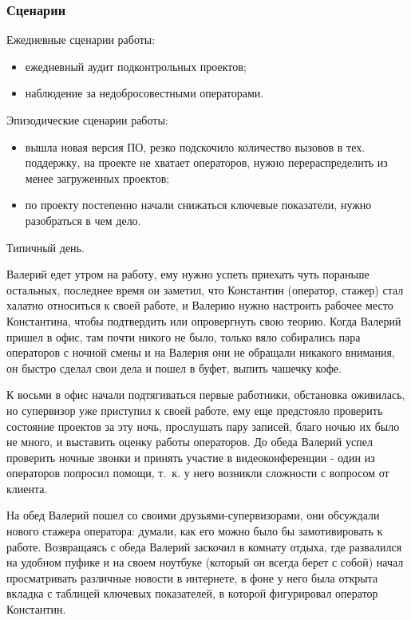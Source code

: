 \subsubsection{Сценарии}

Ежедневные сценарии работы:
\begin{itemize}
    \item ежедневный аудит подконтрольных проектов;
    \item наблюдение за недобросовестными операторами.
\end{itemize}

Эпизодические сценарии работы:
\begin{itemize}
    \item вышла новая версия ПО, резко подскочило количество вызовов в тех. поддержку, на проекте не хватает операторов, нужно перераспределить из менее загруженных проектов;
    \item по проекту постепенно начали снижаться ключевые показатели, нужно разобраться в чем дело.
\end{itemize}

Типичный день.

Валерий едет утром на работу, ему нужно успеть приехать чуть пораньше остальных,
последнее время он заметил, что Константин (оператор, стажер)
стал халатно относиться к своей работе,
и Валерию нужно настроить рабочее место Константина,
чтобы подтвердить или опровергнуть свою теорию.
Когда Валерий пришел в офис, там почти никого не было,
только вяло собирались пара операторов с ночной смены
и на Валерия они не обращали никакого внимания,
он быстро сделал свои дела и пошел в буфет, выпить чашечку кофе.

К восьми в офис начали подтягиваться первые работники, обстановка оживилась,
но супервизор уже приступил к своей работе,
ему еще предстояло проверить состояние проектов за эту ночь,
прослушать пару записей, благо ночью их было не много,
и выставить оценку работы операторов.
До обеда Валерий успел проверить ночные звонки и принять участие в
видеоконференции - один из операторов попросил помощи,
т.~к. у него возникли сложности с вопросом от клиента.

На обед Валерий пошел со своими друзьями-супервизорами, они обсуждали нового стажера оператора: думали, как его можно было бы замотивировать к работе. Возвращаясь с обеда Валерий заскочил в комнату отдыха, где развалился на удобном пуфике и на своем ноутбуке (который он всегда берет с собой) начал просматривать различные новости в интернете, в фоне у него была открыта вкладка с таблицей ключевых показателей, в которой фигурировал оператор Константин.

